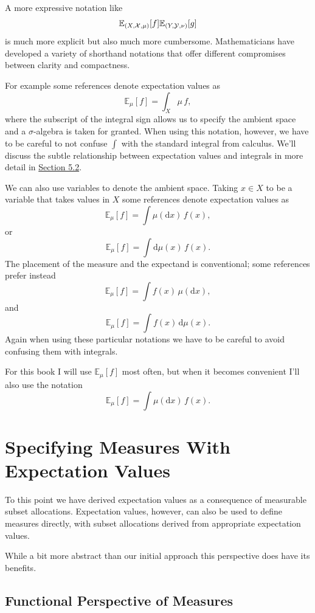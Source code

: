 \documentclass[
  letterpaper,
  DIV=11,
  numbers=noendperiod]{scrartcl}
\begin{document}
A more expressive notation like \[
\mathbb{E}_{(X, \mathcal{X}, \mu)}[f]
\\
\mathbb{E}_{(Y, \mathcal{Y}, \nu)}[g]
\] is much more explicit but also much more cumbersome. Mathematicians
have developed a variety of shorthand notations that offer different
compromises between clarity and compactness.

For example some references denote expectation values as \[
\mathbb{E}_{\mu}[f] = \int_{X} \mu \, f,
\] where the subscript of the integral sign allows us to specify the
ambient space and a \(\sigma\)-algebra is taken for granted. When using
this notation, however, we have to be careful to not confuse \(\int\)
with the standard integral from calculus. We'll discuss the subtle
relationship between expectation values and integrals in more detail in
\href{@sec:expectation_as_integration}{Section 5.2}.

We can also use variables to denote the ambient space. Taking
\(x \in X\) to be a variable that takes values in \(X\) some references
denote expectation values as \[
\mathbb{E}_{\mu}[f] = \int \mu(\mathrm{d} x) \, f(x),
\] or \[
\mathbb{E}_{\mu}[f] = \int \mathrm{d} \mu(x) \, f(x).
\] The placement of the measure and the expectand is conventional; some
references prefer instead \[
\mathbb{E}_{\mu}[f] = \int f(x) \, \mu(\mathrm{d} x),
\] and \[
\mathbb{E}_{\mu}[f] = \int f(x) \, \mathrm{d} \mu(x).
\] Again when using these particular notations we have to be careful to
avoid confusing them with integrals.

For this book I will use \(\mathbb{E}_{\mu}[f]\) most often, but when it
becomes convenient I'll also use the notation \[
\mathbb{E}_{\mu}[f] = \int \mu(\mathrm{d} x) \, f(x).
\]

\hypertarget{specifying-measures-with-expectation-values}{%
\section{Specifying Measures With Expectation
Values}\label{specifying-measures-with-expectation-values}}

To this point we have derived expectation values as a consequence of
measurable subset allocations. Expectation values, however, can also be
used to define measures directly, with subset allocations derived from
appropriate expectation values.

While a bit more abstract than our initial approach this perspective
does have its benefits.

\hypertarget{functional-perspective-of-measures}{%
\subsection{Functional Perspective of
Measures}\label{functional-perspective-of-measures}}
\end{document}
